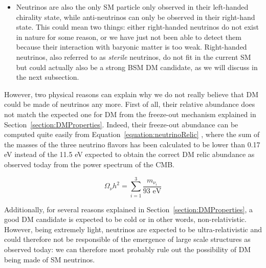 \documentclass[a4paper, 10pt, openright]{report}
\begin{document}
\begin{itemize}
\item Neutrinos are also the only \ac{SM} particle only observed in their left-handed chirality state, while anti-neutrinos can only be observed in their right-hand state. This could mean two things: either right-handed neutrinos do not exist in nature for some reason, or we have just not been able to detect them because their interaction with baryonic matter is too weak. Right-handed neutrinos, also referred to as \textit{sterile} neutrinos, do not fit in the current \ac{SM} but could actually also be a strong \ac{BSM} \ac{DM} candidate, as we will discuss in the next subsection.

%
\end{itemize}

However, two physical reasons can explain why we do not really believe that \ac{DM} could be made of neutrinos any more. First of all, their relative abundance does not match the expected one for \ac{DM} from the freeze-out mechanism explained in Section~\ref{section:DMProperties}. Indeed, their freeze-out abundance can be computed quite easily from Equation~\ref{equation:neutrinoRelic} \cite{WIMPBook}, where the sum of the masses of the three neutrino flavors has been calculated to be lower than 0.17 eV \cite{NeutrinoMass} instead of the 11.5 eV expected to obtain the correct \ac{DM} relic abundance as observed today from the power spectrum of the \ac{CMB}. 

\begin{equation}
\label{equation:neutrinoRelic}
\Omega_\nu h^2 = \sum_{i=1}^3 \frac{m_{\nu_i}}{93 \text{ eV}}
\end{equation}

Additionally, for several reasons explained in Section~\ref{section:DMProperties}, a good \ac{DM} candidate is expected to be cold or in other words, non-relativistic. However, being extremely light, neutrinos are expected to be ultra-relativistic and could therefore not be responsible of the emergence of large scale structures as observed today: we can therefore most probably rule out the possibility of \ac{DM} being made of \ac{SM} neutrinos.
\end{document}
